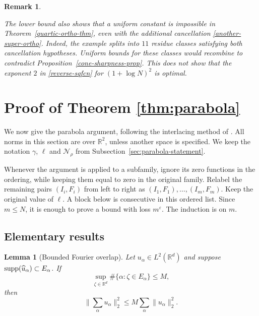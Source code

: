 \documentclass{amsart}
\numberwithin{equation}{section}
\newtheorem{lemma}[theorem]{Lemma}
\newtheorem{remark}[theorem]{Remark}
\newcommand{\ZR}{\mathbb{R}}
\newcommand{\R}{\mathbb{R}}
\newcommand{\supp}{{\rm supp}}
\begin{document}
\medskip 

\begin{remark}
\label{slow-growing-rmk}

\rm

The lower bound also shows that a uniform constant is impossible in Theorem~\ref{quartic-ortho-thm}, even with the additional cancellation \eqref{another-super-ortho}. 
Indeed, the example splits into $11$ residue classes satisfying both cancellation hypotheses.
Uniform bounds for these classes would recombine to contradict Proposition~\ref{cone-sharpness-prop}. 
This does not show that the exponent $2$ in \eqref{reverse-sqfcn} for $(1+\log N)^2$ is optimal.
\end{remark}



\bigskip 




\section{Proof of Theorem \ref{thm:parabola}}
\label{sec:parabola}

We now give the  parabola argument, following the interlacing method of \cite{Cushman-Demeter-Wu}. 
All norms in this section are over $\ZR^2$, unless another space is specified. 
We keep the notation $\gamma$, $\ell$ and $\mathcal N_\rho$ from Subsection~\ref{sec:parabola-statement}.

Whenever the argument is applied to a subfamily, ignore its zero functions in the ordering, while keeping them equal to zero in the original family. 
Relabel the remaining pairs $(I_i,F_i)$ from left to right as $(I_1,F_1),\ldots,(I_m,F_m)$.  
Keep the original value of $\ell$.  
A block below is consecutive in this ordered list.  
Since $m\le N$, it is enough to prove a bound with loss $m^\varepsilon$.  
The induction is on $m$.

\medskip 

\subsection{Elementary results}

\begin{lemma}[Bounded Fourier overlap]\label{lem:overlap}
Let $u_\alpha\in L^2(\R^d)$ and suppose
$\supp(\widehat u_\alpha)\subset E_\alpha$.  If
\[
 \sup_{\zeta\in\R^d}\#\{\alpha:\zeta\in E_\alpha\}\le M,
\]
then
\[
 \Big\|\sum_\alpha u_\alpha\Big\|_2^2
 \le M\sum_\alpha\|u_\alpha\|_2^2.
\]
\end{lemma}
\end{document}
